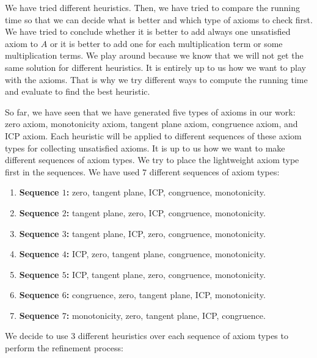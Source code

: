 \noindent We have tried different heuristics.
Then, we have tried to compare the running time so that we can decide what is better and which type of axioms to check first.
We have tried to conclude whether it is better to add always one unsatisfied axiom to $A$ or it is better to add one for each multiplication term or some multiplication terms.
We play around because we know that we will not get the same solution for different heuristics.
It is entirely up to us how we want to play with the axioms.
That is why we try different ways to compute the running time and evaluate to find the best heuristic.\newline

\noindent So far, we have seen that we have generated five types of axioms in our work: zero axiom, monotonicity axiom, tangent plane axiom, congruence axiom, and ICP axiom.
Each heuristic will be applied to different sequences of these axiom types for collecting unsatisfied axioms.
It is up to us how we want to make different sequences of axiom types.
We try to place the lightweight axiom type first in the sequences.
We have used $7$ different sequences of axiom types:

\begin{enumerate}
    \item \textbf{Sequence $1$:} zero, tangent plane, ICP, congruence, monotonicity. \label{item:sequences}
    \item \textbf{Sequence $2$:} tangent plane, zero, ICP, congruence, monotonicity.
    \item \textbf{Sequence $3$:} tangent plane, ICP, zero, congruence, monotonicity.
    \item \textbf{Sequence $4$:} ICP, zero, tangent plane, congruence, monotonicity.
    \item \textbf{Sequence $5$:} ICP, tangent plane, zero, congruence, monotonicity.
    \item \textbf{Sequence $6$:} congruence, zero, tangent plane, ICP, monotonicity.
    \item \textbf{Sequence $7$:} monotonicity, zero, tangent plane, ICP, congruence.
\end{enumerate}

\noindent We decide to use $3$ different heuristics over each sequence of axiom types to perform the refinement process:

